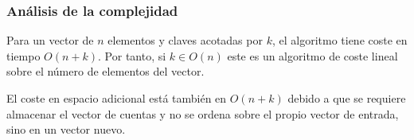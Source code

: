 \documentclass{beamer}
\begin{document}
\begin{frame}
\frametitle{Análisis de la complejidad}
Para un vector de $n$ elementos y claves acotadas por $k$, el algoritmo tiene coste en tiempo $O(n+k)$. Por tanto, si $k\in O(n)$ este es un algoritmo de coste lineal sobre el número de elementos del vector.

\vspace{0.5 cm}
El coste en espacio adicional está también en $O(n+k)$ debido a que se requiere almacenar el vector de cuentas y no se ordena sobre el propio vector de entrada, sino en un vector nuevo.




\end{frame}
\end{document}
